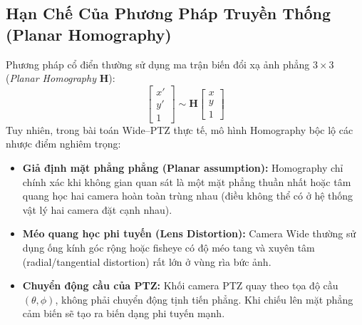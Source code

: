 \documentclass[11pt,a4paper]{article}
\begin{document}
\subsection{Hạn Chế Của Phương Pháp Truyền Thống (Planar Homography)}
Phương pháp cổ điển thường sử dụng ma trận biến đổi xạ ảnh phẳng $3 \times 3$ (\textit{Planar Homography} $\mathbf{H}$):
\begin{equation}
    \begin{bmatrix} x' \\ y' \\ 1 \end{bmatrix} \sim \mathbf{H} \begin{bmatrix} x \\ y \\ 1 \end{bmatrix}
\end{equation}
Tuy nhiên, trong bài toán Wide--PTZ thực tế, mô hình Homography bộc lộ các nhược điểm nghiêm trọng:
\begin{itemize}[leftmargin=1.5cm]
    \item[$\times$] \textbf{Giả định mặt phẳng phẳng (Planar assumption):} Homography chỉ chính xác khi không gian quan sát là một mặt phẳng thuần nhất hoặc tâm quang học hai camera hoàn toàn trùng nhau (điều không thể có ở hệ thống vật lý hai camera đặt cạnh nhau).
    \item[$\times$] \textbf{Méo quang học phi tuyến (Lens Distortion):} Camera Wide thường sử dụng ống kính góc rộng hoặc fisheye có độ méo tang và xuyên tâm (radial/tangential distortion) rất lớn ở vùng rìa bức ảnh.
    \item[$\times$] \textbf{Chuyển động cầu của PTZ:} Khối camera PTZ quay theo tọa độ cầu $(\theta, \phi)$, không phải chuyển động tịnh tiến phẳng. Khi chiếu lên mặt phẳng cảm biến sẽ tạo ra biến dạng phi tuyến mạnh.
\end{itemize}
\end{document}
